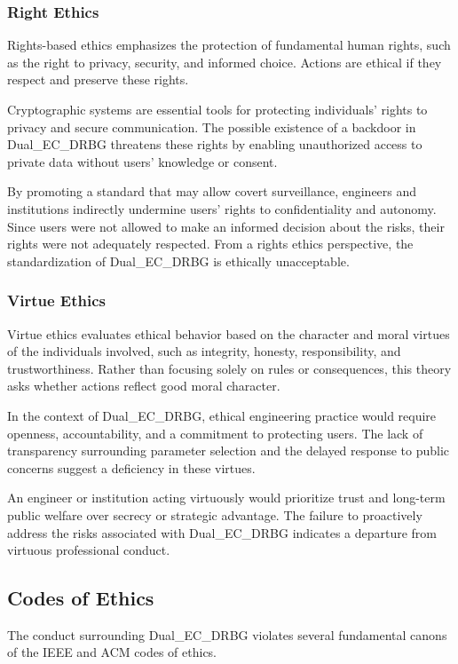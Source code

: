 \documentclass[12pt,letterpaper]{article}
\begin{document}
\subsubsection{Right Ethics}
Rights-based ethics emphasizes the protection of fundamental human rights, such as the right to privacy, security, and informed choice. Actions are ethical if they respect and preserve these rights.

Cryptographic systems are essential tools for protecting individuals’ rights to privacy and secure communication. The possible existence of a backdoor in Dual\_EC\_DRBG threatens these rights by enabling unauthorized access to private data without users’ knowledge or consent.

By promoting a standard that may allow covert surveillance, engineers and institutions indirectly undermine users’ rights to confidentiality and autonomy. Since users were not allowed to make an informed decision about the risks, their rights were not adequately respected. From a rights ethics perspective, the standardization of Dual\_EC\_DRBG is ethically unacceptable.

\subsubsection{Virtue Ethics}
Virtue ethics evaluates ethical behavior based on the character and moral virtues of the individuals involved, such as integrity, honesty, responsibility, and trustworthiness. Rather than focusing solely on rules or consequences, this theory asks whether actions reflect good moral character.

In the context of Dual\_EC\_DRBG, ethical engineering practice would require openness, accountability, and a commitment to protecting users. The lack of transparency surrounding parameter selection and the delayed response to public concerns suggest a deficiency in these virtues.

An engineer or institution acting virtuously would prioritize trust and long-term public welfare over secrecy or strategic advantage. The failure to proactively address the risks associated with Dual\_EC\_DRBG indicates a departure from virtuous professional conduct.

\subsection{Codes of Ethics}
The conduct surrounding Dual\_EC\_DRBG violates several fundamental canons of the IEEE and ACM codes of ethics.
\end{document}
